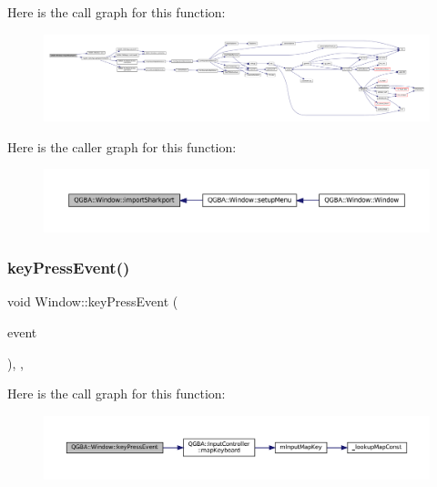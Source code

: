 Here is the call graph for this function\+:
\nopagebreak
\begin{figure}[H]
\begin{center}
\leavevmode
\includegraphics[width=350pt]{class_q_g_b_a_1_1_window_a6b323a99433d192ca86d725b8336bfda_cgraph}
\end{center}
\end{figure}
Here is the caller graph for this function\+:
\nopagebreak
\begin{figure}[H]
\begin{center}
\leavevmode
\includegraphics[width=350pt]{class_q_g_b_a_1_1_window_a6b323a99433d192ca86d725b8336bfda_icgraph}
\end{center}
\end{figure}
\mbox{\label{class_q_g_b_a_1_1_window_a2594ee922d42d87af1e9bba7d2b27c34}} 
\subsubsection{\texorpdfstring{key\+Press\+Event()}{keyPressEvent()}}
{\footnotesize\ttfamily void Window\+::key\+Press\+Event (\begin{DoxyParamCaption}\item[{Q\+Key\+Event $\ast$}]{event }\end{DoxyParamCaption})\hspace{0.3cm}{\ttfamily [override]}, {\ttfamily [protected]}, {\ttfamily [virtual]}}

Here is the call graph for this function\+:
\nopagebreak
\begin{figure}[H]
\begin{center}
\leavevmode
\includegraphics[width=350pt]{class_q_g_b_a_1_1_window_a2594ee922d42d87af1e9bba7d2b27c34_cgraph}
\end{center}
\end{figure}
\mbox{\label{class_q_g_b_a_1_1_window_af4cac6fae4caf6d917b26a03f3a9fa5d}} 
